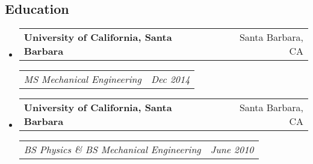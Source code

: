 \documentclass[10pt,letterpaper]{article}
\makeatletter
\newcommand{\headerrow}[2]{
\begin{tabular*}{\linewidth}{l@{\extracolsep{\fill}}r}
		#1 &
		#2 \\
	\end{tabular*}
}
\newcommand{\jobitem}[4]{\item \headerrow{\textbf{#1}}{#2}
\headerrow{\emph{#3}}{\emph{#4}}}
\makeatother
\begin{document}
\subsection*{Education}
\begin{itemize}
	\jobitem{University of California, Santa Barbara}{Santa Barbara, CA}
		    {MS  Mechanical Engineering}{Dec 2014}
		    
	\jobitem{University of California, Santa Barbara}{Santa Barbara, CA}	
		    {BS Physics \&  BS Mechanical Engineering}{June 2010}
\end{itemize}
\end{document}
